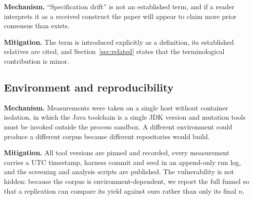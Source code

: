 \textbf{Mechanism.} ``Specification drift'' is not an established term, and if a reader interprets it
as a received construct the paper will appear to claim more prior consensus than exists.

\textbf{Mitigation.} The term is introduced explicitly as a definition, its established relatives are
cited, and Section~\ref{sec:related} states that the terminological contribution is minor.

\subsection{Environment and reproducibility}

\textbf{Mechanism.} Measurements were taken on a single host without container isolation, in which the
Java toolchain is a single JDK version and mutation tools must be invoked outside the process sandbox.
A different environment could produce a different corpus because different repositories would build.

\textbf{Mitigation.} All tool versions are pinned and recorded, every measurement carries a UTC
timestamp, harness commit and seed in an append-only run log, and the screening and analysis scripts
are published. The vulnerability is not hidden: because the corpus is environment-dependent, we
report the full funnel so that a replication can compare its yield against ours rather than only its
final $n$.

